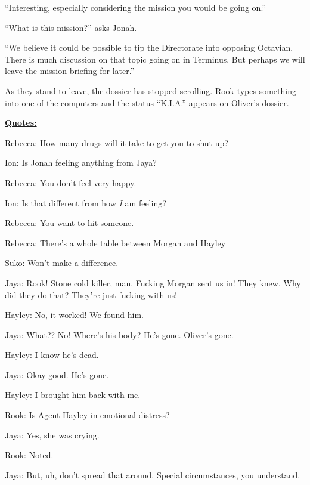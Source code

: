 ``Interesting, especially considering the mission you would be going on.''

``What is this mission?'' asks Jonah.

``We believe it could be possible to tip the Directorate into opposing Octavian.  There is much discussion on that topic going on in Terminus.  But perhaps we will leave the mission briefing for later.''



As they stand to leave, the dossier has stopped scrolling.  Rook types something into one of the computers and the status ``K.I.A.'' appears on Oliver's dossier.









\underline{ \textbf{Quotes:} }



Rebecca: How many drugs will it take to get you to shut up?



Ion: Is Jonah feeling anything from Jaya?

Rebecca: You don't feel very happy.

Ion: Is that different from how\textit{ I} am feeling?

Rebecca: You want to hit someone.



Rebecca: There's a whole table between Morgan and Hayley

Suko: Won't make a difference.



Jaya: Rook!  Stone cold killer, man.  Fucking Morgan sent us in!  They knew.  Why did they do that?  They're just fucking with us!

Hayley: No, it worked!  We found him.

Jaya: What??  No!  Where's his body? He's gone.  Oliver's gone.

Hayley: I know he's dead.

Jaya: Okay good. He's gone.

Hayley: I brought him back with me.



Rook: Is Agent Hayley in emotional distress?

Jaya: Yes, she was crying.

Rook: Noted.

Jaya: But, uh, don't spread that around.  Special circumstances, you understand.


